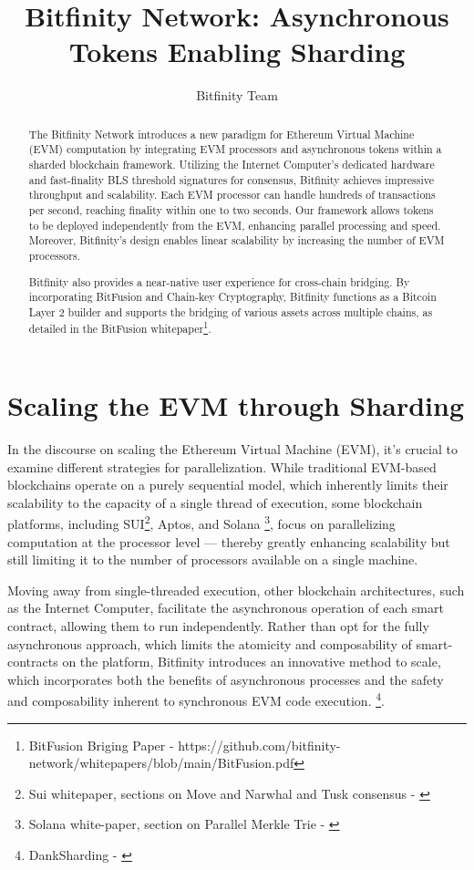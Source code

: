 \documentclass{article}
\title{Bitfinity Network: Asynchronous Tokens Enabling Sharding}
\author{Bitfinity Team}
\begin{document}
\maketitle

\begin{abstract}
\noindent The Bitfinity Network introduces a new paradigm for Ethereum Virtual Machine (EVM) computation by integrating EVM processors and asynchronous tokens within a sharded blockchain framework. Utilizing the Internet Computer's dedicated hardware and fast-finality BLS threshold signatures for consensus, Bitfinity achieves impressive throughput and scalability. Each EVM processor can handle hundreds of transactions per second, reaching finality within one to two seconds. Our framework allows tokens to be deployed independently from the EVM, enhancing parallel processing and speed. Moreover, Bitfinity's design enables linear scalability by increasing the number of EVM processors.

Bitfinity also provides a near-native user experience for cross-chain bridging. By incorporating BitFusion and Chain-key Cryptography, Bitfinity functions as a Bitcoin Layer 2 builder and supports the bridging of various assets across multiple chains, as detailed in the BitFusion whitepaper\footnote{BitFusion Briging Paper - 
https://github.com/bitfinity-network/whitepapers/blob/main/BitFusion.pdf}.

\end{abstract}

\tableofcontents

\section{Scaling the EVM through Sharding}
In the discourse on scaling the Ethereum Virtual Machine (EVM), it’s crucial to examine different strategies for parallelization. While traditional EVM-based blockchains operate on a purely sequential model, which inherently limits their scalability to the capacity of a single thread of execution, some blockchain platforms, including SUI\footnote{Sui whitepaper, sections on Move and Narwhal and Tusk consensus - \cite{sui}}, Aptos, and Solana \footnote{Solana white-paper, section on Parallel Merkle Trie - \cite{solana}}, focus on parallelizing computation at the processor level — thereby greatly enhancing scalability but still limiting it to the number of processors available on a single machine.

Moving away from single-threaded execution, other blockchain architectures, such as the Internet Computer, facilitate the asynchronous operation of each smart contract, allowing them to run independently. Rather than opt for the fully asynchronous approach, which limits the atomicity and composability of smart-contracts on the platform, Bitfinity introduces an innovative method to scale, which incorporates both the benefits of asynchronous processes and the safety and composability inherent to synchronous EVM code execution. \footnote{DankSharding - \cite{danksharding}}. 
\end{document}
